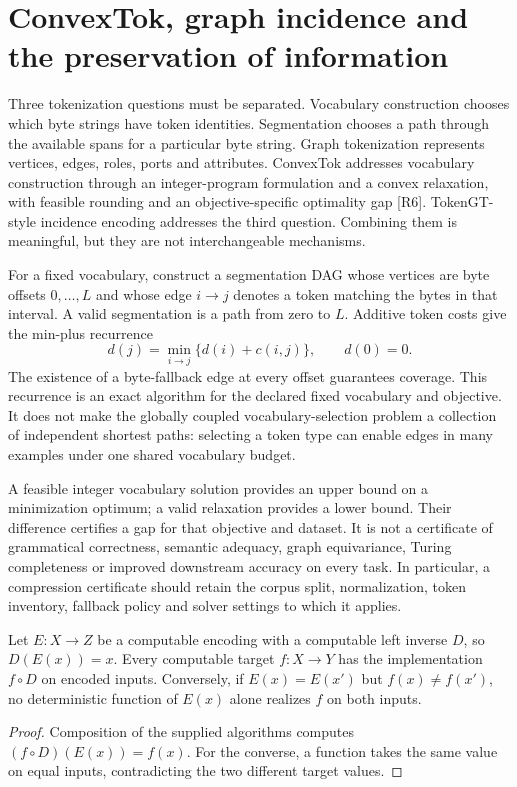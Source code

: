 \section{ConvexTok, graph incidence and the preservation of information}
\label{sec:wb-convextok}

Three tokenization questions must be separated. Vocabulary construction chooses which byte strings have token identities. Segmentation chooses a path through the available spans for a particular byte string. Graph tokenization represents vertices, edges, roles, ports and attributes. ConvexTok addresses vocabulary construction through an integer-program formulation and a convex relaxation, with feasible rounding and an objective-specific optimality gap [R6]. TokenGT-style incidence encoding addresses the third question. Combining them is meaningful, but they are not interchangeable mechanisms.

For a fixed vocabulary, construct a segmentation DAG whose vertices are byte offsets $0,\ldots,L$ and whose edge $i\to j$ denotes a token matching the bytes in that interval. A valid segmentation is a path from zero to $L$. Additive token costs give the min-plus recurrence
\[
 d(j)=\min_{i\to j}\{d(i)+c(i,j)\},\qquad d(0)=0.
\]
The existence of a byte-fallback edge at every offset guarantees coverage. This recurrence is an exact algorithm for the declared fixed vocabulary and objective. It does not make the globally coupled vocabulary-selection problem a collection of independent shortest paths: selecting a token type can enable edges in many examples under one shared vocabulary budget.

A feasible integer vocabulary solution provides an upper bound on a minimization optimum; a valid relaxation provides a lower bound. Their difference certifies a gap for that objective and dataset. It is not a certificate of grammatical correctness, semantic adequacy, graph equivariance, Turing completeness or improved downstream accuracy on every task. In particular, a compression certificate should retain the corpus split, normalization, token inventory, fallback policy and solver settings to which it applies.

\begin{proposition}
Let $E:X\to Z$ be a computable encoding with a computable left inverse $D$, so $D(E(x))=x$. Every computable target $f:X\to Y$ has the implementation $f\circ D$ on encoded inputs. Conversely, if $E(x)=E(x')$ but $f(x)\ne f(x')$, no deterministic function of $E(x)$ alone realizes $f$ on both inputs.
\end{proposition}
\begin{proof}
Composition of the supplied algorithms computes $(f\circ D)(E(x))=f(x)$. For the converse, a function takes the same value on equal inputs, contradicting the two different target values.
\end{proof}

